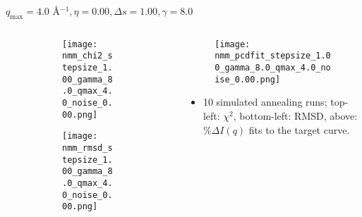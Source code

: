 \documentclass{beamer}
\begin{document}
\begin{frame}{$ q_{\textrm{max}}=4.0 $ \AA $^{-1}, \eta=0.00, \Delta s=1.00, \gamma=8.0$}
	\begin{columns}
		\begin{column}{.5\textwidth}
			\begin{figure}[H]
			\centering
			\begin{subfigure}[b]{\textwidth}
				\centering
				\texttt{[image: nmm\_chi2\_stepsize\_1.00\_gamma\_8.0\_qmax\_4.0\_noise\_0.00.png]}
				\label{fig:}
			\end{subfigure}
			\begin{subfigure}[b]{\textwidth}
				\centering
				\texttt{[image: nmm\_rmsd\_stepsize\_1.00\_gamma\_8.0\_qmax\_4.0\_noise\_0.00.png]}
				\label{fig:}
			\end{subfigure}
			\end{figure}
		\end{column}
		\begin{column}{.5\textwidth}
			\begin{figure}[H]
				\centering
				\texttt{[image: nmm\_pcdfit\_stepsize\_1.00\_gamma\_8.0\_qmax\_4.0\_noise\_0.00.png]}
				\label{fig:}
			\end{figure}
			\begin{itemize}
				\item 10 simulated annealing runs; top-left: $\chi^2$, bottom-left: RMSD, above: $\%\Delta I(q)$ fits to the target curve.
			\end{itemize}
		\end{column}
	\end{columns}
\end{frame}
 
\end{document}
